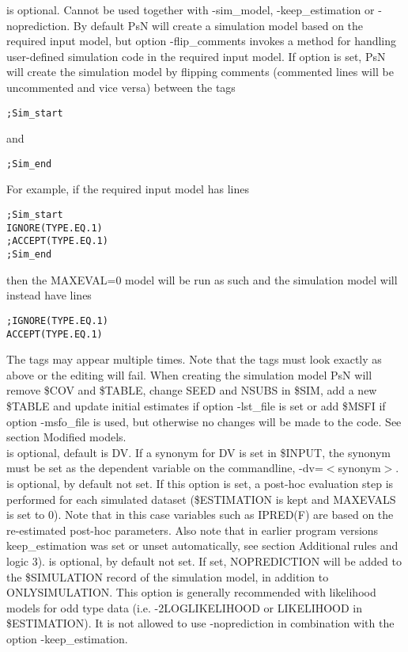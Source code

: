 \begin{optionlist}
\nextopt
{}
is optional. Cannot be used together with -sim\_model, -keep\_estimation or -noprediction. By default PsN will create a simulation model based on the  required input model, but option -flip\_comments invokes a method for handling user-defined simulation code in the required input model. If option is set, PsN will create the simulation model by flipping comments (commented lines will be uncommented and vice versa) between the tags


\begin{verbatim}
;Sim_start
\end{verbatim}
and 
\begin{verbatim}
;Sim_end
\end{verbatim}
For example, if the required input model has lines
\begin{verbatim}
;Sim_start 
IGNORE(TYPE.EQ.1)
;ACCEPT(TYPE.EQ.1) 
;Sim_end
\end{verbatim}
then the MAXEVAL=0 model will be run as such and the simulation model will instead have lines
\begin{verbatim}
;IGNORE(TYPE.EQ.1)
ACCEPT(TYPE.EQ.1) 
\end{verbatim}
The tags may appear multiple times. Note that the tags must look exactly  as above or the editing will fail. When creating the simulation model PsN will remove \$COV and \$TABLE, change SEED and NSUBS in \$SIM, add a new \$TABLE and  update initial estimates if option -lst\_file is set or add \$MSFI if option -msfo\_file is used, but otherwise no changes will be made to the code. See section Modified models.\\
\nextopt
{}
is optional, default is DV. If a synonym for DV is set in \mbox{\$INPUT}, the synonym must be set as the dependent variable on the commandline, -dv=$<$synonym$>$. 
\nextopt
{}
is optional, by default not set. If this option is set, a post-hoc evaluation step is performed for each simulated dataset (\mbox{\$ESTIMATION} is kept and MAXEVALS is set to 0). Note that in this case variables such as IPRED(F) are based on the re-estimated post-hoc parameters. Also note that in earlier program versions keep\_estimation was set or unset automatically, see section Additional rules and logic 3). 
\nextopt
{}
is optional, by default not set. If set, NOPREDICTION will be added to the \$SIMULATION record of the simulation model, in addition to ONLYSIMULATION. This option is generally recommended with likelihood models for odd type data (i.e. -2LOGLIKELIHOOD or LIKELIHOOD in \$ESTIMATION). It is not allowed to use -noprediction in combination with the option \mbox{-keep\_estimation}. 

\end{optionlist}
